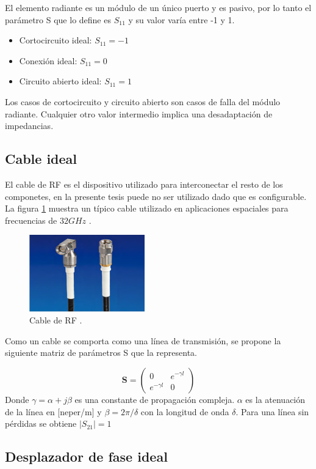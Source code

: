 El elemento radiante es un módulo de un único puerto y es pasivo, por lo tanto el parámetro S que lo define es $S_{11}$ y su
valor varía entre -1 y 1.

\begin{itemize}
	\item Cortocircuito ideal: $S_{11} = -1$
	\item Conexión ideal: $S_{11} = 0$
	\item Circuito abierto ideal: $S_{11} = 1$
\end{itemize}

Los casos de cortocircuito y circuito abierto son casos de falla del módulo radiante. Cualquier otro valor intermedio implica
una desadaptación de impedancias.

\subsection{Cable ideal}
El cable de RF es el dispositivo utilizado para interconectar el resto de los componetes, en la presente tesis puede no ser 
utilizado dado que es configurable. La figura \ref{fig:cableRF} muestra un típico cable utilizado en aplicaciones espaciales 
para frecuencias de $32GHz$ \cite{Gore2013}.

\begin{figure}[H]
 \centering
 \includegraphics[width=5cm]{gfx/cableRF.png}
 \caption{Cable de RF \cite{Gore2013}.}
 \label{fig:cableRF}
\end{figure}

Como un cable se comporta como una línea de transmisión, se propone la siguiente matriz de parámetros S que la 
representa.

$$
\mathbf{S} = \begin{pmatrix} 0 & e^{-\gamma l}\\e^{-\gamma l} & 0\end{pmatrix}
$$
Donde $\gamma = \alpha + j\beta$ es una constante de propagación compleja. $\alpha$ es la atenuación de la línea en [neper/m]
y $\beta = 2\pi/\delta$ con la longitud de onda $\delta$. Para una línea sin pérdidas se obtiene $|S_{21}| = 1$

\subsection{Desplazador de fase ideal}

